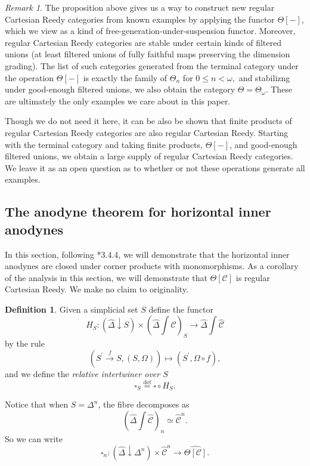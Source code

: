 \documentclass[a4paper]{article}
\numberwithin{equation}{subsection}
\theoremstyle{plain}   %
\theoremstyle{definition}
\newtheorem{defn}[equation]{Definition}
\theoremstyle{remark}
\newtheorem{rem}[equation]{Remark}
\theoremstyle{plain}
\newcommand{\overcat}[2]{{\left(#1\downarrow #2\right)}}
\newcommand{\psh}[1]{\ensuremath{\widehat{#1}}}
\providecommand{\C}{}
\renewcommand{\C}{\ensuremath{\mathcal{C}}}
\newcommand{\defeq}{\overset{\mathrm{def}}=}
\newcommand{\cellset}{\ensuremath{\widehat{\Theta[\mathcal{C}]}}}
\newcommand{\ssetlab}{\ensuremath{\widehat{\Delta} \int \widehat{\mathcal{C}}}}
\begin{document}
\begin{rem}
	The proposition above gives us a way to construct new regular Cartesian Reedy categories from known examples by applying the functor \(\Theta[-]\), which we view as a kind of free-generation-under-suspension functor. Moreover, regular Cartesian Reedy categories are stable under certain kinds of filtered unions (at least filtered unions of fully faithful maps preserving the dimension grading). The list of such categories generated from the terminal category under the operation \(\Theta[-]\) is exactly the family of \(\Theta_n\) for \(0\leq n < \omega,\) and stabilizng under good-enough filtered unions, we also obtain the category \(\Theta=\Theta_\omega\).   These are ultimately the only examples we care about in this paper.
	
	Though we do not need it here, it can be also be shown that finite products of regular Cartesian Reedy categories are also regular Cartesian Reedy. Starting with the terminal category and taking finite products, \(\Theta[-]\), and good-enough filtered unions, we obtain a large supply of regular Cartesian Reedy categories.  We leave it as an open question as to whether or not these operations generate all examples. 
\end{rem}
\subsection{The anodyne theorem for horizontal inner anodynes}\label{horizontal}
In this section, following \cite{oury}*{3.4.4}, we will demonstrate that the horizontal inner anodynes are closed under corner products with monomorphisms.  As a corollary of the analysis in this section, we will demonstrate that \(\Theta[\C]\) is regular Cartesian Reedy.  We make no claim to originality.

\begin{defn} Given a simplicial set \(S\) define the functor 
	\[H_S: \overcat{\psh{\Delta}}{S} \times  \left(\ssetlab\right)_S \to \ssetlab\]
	by the rule
	\[\left(S^\prime \xrightarrow{f} S, (S,\Omega)\right) \mapsto (S^\prime,  \Omega\circ f),\]
	and we define the \emph{relative intertwiner over \(S\)}
	\[\square_S \defeq \square \circ H_S.\]
	
	Notice that when \(S=\Delta^n\), the fibre decomposes as \[\left(\ssetlab\right)_n\simeq \psh{\C}^n.\] So we can write 
	\[\square_n:\overcat{\psh{\Delta}}{\Delta^n} \times \psh{\C}^n \to \cellset.\]
\end{defn}
\end{document}
